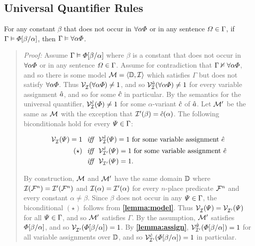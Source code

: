 \subsection{Universal Quantifier Rules}%
  \label{sub:UniversalRules}
  

\begin{Lthm} \label{lemma:unigen}
  For any constant $\beta$ that does not occur in $\forall \alpha\varPhi$ or in any sentence $\varOmega\in\Gamma$, if $\Gamma \vDash \varPhi[\beta/\alpha]$, then $\Gamma \vDash \forall \alpha\varPhi$. 
\end{Lthm}

\begin{quote} 
  \textit{Proof:} Assume $\Gamma \vDash \varPhi[\beta/\alpha]$ where $\beta$ is a constant that does not occur in $\forall\alpha\varPhi$ or in any sentence $\varOmega\in\Gamma$.
  Assume for contradiction that $\Gamma \nvDash \forall \alpha\varPhi$, and so there is some model $\mathcal{M}=\langle\mathbb{D},\mathcal{I}\rangle$ which satisfies $\Gamma$ but does not satisfy $\forall \alpha\varPhi$.
  Thus $\mathcal{V}_{\mathcal{I}}^{}(\forall \alpha\varPhi)\neq 1$, and so $\mathcal{V}_{\mathcal{I}}^{\hat{a}}(\forall \alpha\varPhi)\neq 1$ for every variable assignment $\hat{a}$, and so for some $\hat{c}$ in particular. 
  By the semantics for the universal quantifier, $\mathcal{V}_{\mathcal{I}}^{\hat{c}}(\varPhi)\neq 1$ for some $\alpha$-variant $\hat{c}$ of $\hat{a}$.
  Let $\mathcal{M}'$ be the same as $\mathcal{M}$ with the exception that $\mathcal{I}'(\beta)=\hat{c}(\alpha)$.
  The following biconditionals hold for every $\varPsi \in \Gamma$:

  \vspace{-.2in}
  \begin{align*}
    \mathcal{V}_{\mathcal{I}}^{}(\varPsi)=1 &\textit{ ~iff~ } \mathcal{V}_{\mathcal{I}}^{\hat{e}}(\varPsi)=1 \text{ for some variable assignment } \hat{e}\\
     (\star) &\textit{ ~iff~ } \mathcal{V}_{\mathcal{I}'}^{\hat{e}}(\varPsi)=1 \text{ for some variable assignment } \hat{e}\\ 
     &\textit{ ~iff~ } \mathcal{V}_{\mathcal{I}'}^{}(\varPsi)=1.
  \end{align*}

  By construction, $\mathcal{M}$ and $\mathcal{M}'$ have the same domain $\mathbb{D}$ where $\mathcal{I}(\mathcal{F}^n)=\mathcal{I}'(\mathcal{F}^n)$ and $\mathcal{I}(\alpha)=\mathcal{I}'(\alpha)$ for every $n$-place predicate $\mathcal{F}^n$ and every constant $\alpha\neq\beta$.
  Since $\beta$ does not occur in any $\varPsi \in \Gamma$, the biconditional $(\star)$ follows from \textbf{\ref{lemma:model}}.
  Thus $\mathcal{V}_{\mathcal{I}}^{}(\varPsi)=\mathcal{V}_{\mathcal{I}'}^{}(\varPsi)$ for all $\varPsi\in\Gamma$, and so $\mathcal{M}'$ satisfies $\Gamma$.
  By the assumption, $\mathcal{M}'$ satisfies $\varPhi[\beta/\alpha]$, and so $\mathcal{V}_{\mathcal{I}'}^{}(\varPhi[\beta/\alpha])=1$.
  By \textbf{\ref{lemma:assign}}, $\mathcal{V}_{\mathcal{I}'}^{\hat{g}}(\varPhi[\beta/\alpha])=1$ for all variable assignments over $\mathbb{D}$, and so $\mathcal{V}_{\mathcal{I}'}^{\hat{c}}(\varPhi[\beta/\alpha])=1$ in particular.


\end{quote}
